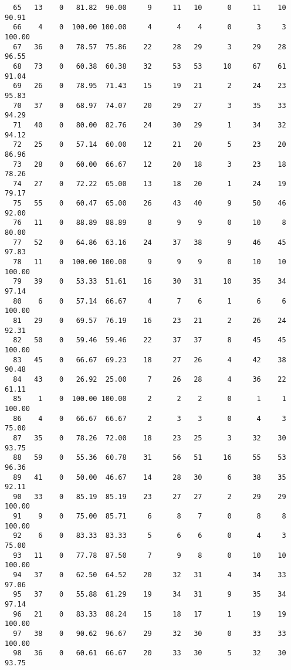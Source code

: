 \begin{verbatim}
  65   13    0   81.82  90.00     9     11   10      0     11    10    90.91
  66    4    0  100.00 100.00     4      4    4      0      3     3   100.00
  67   36    0   78.57  75.86    22     28   29      3     29    28    96.55
  68   73    0   60.38  60.38    32     53   53     10     67    61    91.04
  69   26    0   78.95  71.43    15     19   21      2     24    23    95.83
  70   37    0   68.97  74.07    20     29   27      3     35    33    94.29
  71   40    0   80.00  82.76    24     30   29      1     34    32    94.12
  72   25    0   57.14  60.00    12     21   20      5     23    20    86.96
  73   28    0   60.00  66.67    12     20   18      3     23    18    78.26
  74   27    0   72.22  65.00    13     18   20      1     24    19    79.17
  75   55    0   60.47  65.00    26     43   40      9     50    46    92.00
  76   11    0   88.89  88.89     8      9    9      0     10     8    80.00
  77   52    0   64.86  63.16    24     37   38      9     46    45    97.83
  78   11    0  100.00 100.00     9      9    9      0     10    10   100.00
  79   39    0   53.33  51.61    16     30   31     10     35    34    97.14
  80    6    0   57.14  66.67     4      7    6      1      6     6   100.00
  81   29    0   69.57  76.19    16     23   21      2     26    24    92.31
  82   50    0   59.46  59.46    22     37   37      8     45    45   100.00
  83   45    0   66.67  69.23    18     27   26      4     42    38    90.48
  84   43    0   26.92  25.00     7     26   28      4     36    22    61.11
  85    1    0  100.00 100.00     2      2    2      0      1     1   100.00
  86    4    0   66.67  66.67     2      3    3      0      4     3    75.00
  87   35    0   78.26  72.00    18     23   25      3     32    30    93.75
  88   59    0   55.36  60.78    31     56   51     16     55    53    96.36
  89   41    0   50.00  46.67    14     28   30      6     38    35    92.11
  90   33    0   85.19  85.19    23     27   27      2     29    29   100.00
  91    9    0   75.00  85.71     6      8    7      0      8     8   100.00
  92    6    0   83.33  83.33     5      6    6      0      4     3    75.00
  93   11    0   77.78  87.50     7      9    8      0     10    10   100.00
  94   37    0   62.50  64.52    20     32   31      4     34    33    97.06
  95   37    0   55.88  61.29    19     34   31      9     35    34    97.14
  96   21    0   83.33  88.24    15     18   17      1     19    19   100.00
  97   38    0   90.62  96.67    29     32   30      0     33    33   100.00
  98   36    0   60.61  66.67    20     33   30      5     32    30    93.75

\end{verbatim}
